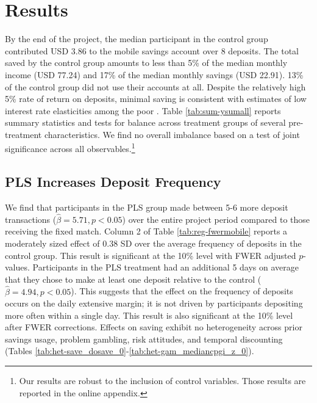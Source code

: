 \documentclass[12pt]{article}
\begin{document}
\section{Results} \label{sec:results}

	By the end of the project, the median participant in the control group contributed USD 3.86 to the mobile savings account over 8 deposits. The total saved by the control group amounts to less than 5\% of the median monthly income (USD 77.24) and 17\% of the median monthly savings (USD 22.91). 13\% of the control group did not use their accounts at all. Despite the relatively high 5\% rate of return on deposits, minimal saving is consistent with estimates of low interest rate elasticities among the poor \parencite{karlan_price_2018}. Table \ref{tab:sum-ysumall} reports summary statistics and tests for balance across treatment groups of several pre-treatment characteristics. We find no overall imbalance based on a test of joint significance across all observables.\footnote{Our results are robust to the inclusion of control variables. Those results are reported in the online appendix.}


	

	\subsection{PLS Increases Deposit Frequency}

		We find that participants in the PLS group made between 5-6 more deposit transactions ($\hat \beta = 5.71, p < 0.05$) over the entire project period compared to those receiving the fixed match. Column 2 of Table \ref{tab:reg-fwermobile} reports a moderately sized effect of 0.38 SD over the average frequency of deposits in the control group. This result is significant at the 10\% level with FWER adjusted $p$-values. Participants in the PLS treatment had an additional 5 days on average that they chose to make at least one deposit relative to the control ($\hat \beta = 4.94, p < 0.05$). This suggests that the effect on the frequency of deposits occurs on the daily extensive margin; it is not driven by participants depositing more often within a single day. This result is also significant at the 10\% level after FWER corrections. Effects on saving exhibit no heterogeneity across prior savings usage, problem gambling, risk attitudes, and temporal discounting (Tables \ref{tab:het-save_dosave_0}-\ref{tab:het-gam_mediancpgi_z_0}).
\end{document}
